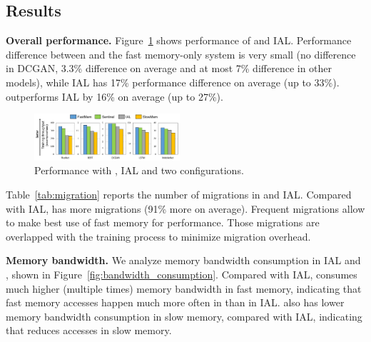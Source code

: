 \vspace{-3pt}
\subsection{Results}

\label{sec:eval_results}
\textbf{Overall performance.}
Figure~\ref{fig:general_perf} shows performance of \name and IAL. Performance difference between \name and the fast memory-only system is very small  (\textcolor{check}{no difference in DCGAN, 3.3\% difference on average and at most 7\% difference in other models}), while IAL has \textcolor{check}{17\% performance difference on average (up to 33\%). \name %
 outperforms IAL by 16\% on average (up to 27\%)}.


\begin{figure}
    \centering
    \includegraphics[width=0.48\textwidth]{figures/sentinel_performance.pdf}
\vspace{-25pt}    
\caption{
\textcolor{check}{
Performance with \name, IAL and two configurations. %
}
\vspace{-15pt}
\label{fig:general_perf}}
\end{figure}

Table~\ref{tab:migration} reports the number of migrations in \name and IAL. Compared with IAL, \name has more migrations \textcolor{check}{(91\% more on average)}. Frequent migrations allow \name to make best use of fast memory for performance.  \textcolor{check}{Those migrations are  overlapped with the training process to minimize migration overhead.}


\textcolor{check}{\textbf{Memory bandwidth.} 
We analyze memory bandwidth consumption in IAL and \name, shown in Figure~\ref{fig:bandwidth_consumption}. 
Compared with IAL, \name consumes much higher (multiple times) memory bandwidth in fast memory, indicating that fast memory accesses happen much more often in \name than in IAL. \name also has lower memory bandwidth consumption in slow memory, compared with IAL, indicating that \name reduces accesses in slow memory.} %

